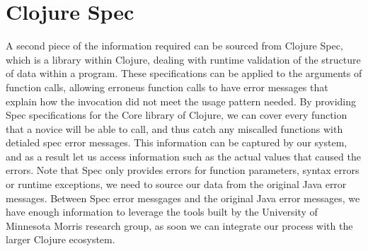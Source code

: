 \documentclass[12pt]{article}
\newcommand{\comment}[1]{{\bf \tt  {#1}}}
\newcommand{\emcomment}[1]{\textcolor{ForestGreen}{\comment{Elena: {#1}}}}
\begin{document}

\section{Clojure Spec}
A second piece of the information required can be sourced from Clojure Spec,
which is a library within Clojure, dealing with runtime validation of
the structure of data within a program. These specifications can be applied to
 the arguments of function calls, allowing erroneus function calls to have
 error messages that explain how the invocation did not meet the usage pattern
 needed. By providing Spec specifications for the Core library of Clojure,
 we can cover every function that a novice will be able to call, and thus catch
 any miscalled functions with detialed spec error messages.
 This information can be captured by our system, and as a result
 let us access information such as the actual values that caused the errors.
Note that Spec only provides errors for function parameters, syntax errors or
runtime exceptions, we need to source our data from the original Java error messages.
Between Spec error messgages and the original Java error messages, we have enough
information to leverage the tools built by the
 University of Minnesota Morris research group, as soon we can integrate
 our process with the larger Clojure ecosystem.
\end{document}

